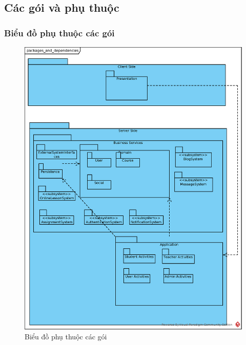 \documentclass[./../main.tex]{subfiles}
\begin{document}
\subsection{Các gói và phụ thuộc}
\subsubsection{Biểu đồ phụ thuộc các gói}
\begin{figure}[H]
	\centering
	\includegraphics[width=\linewidth]{./images/packages_and_dependencies.eps}
	\caption{Biểu đồ phụ thuộc các gói}
\end{figure}
\end{document}
